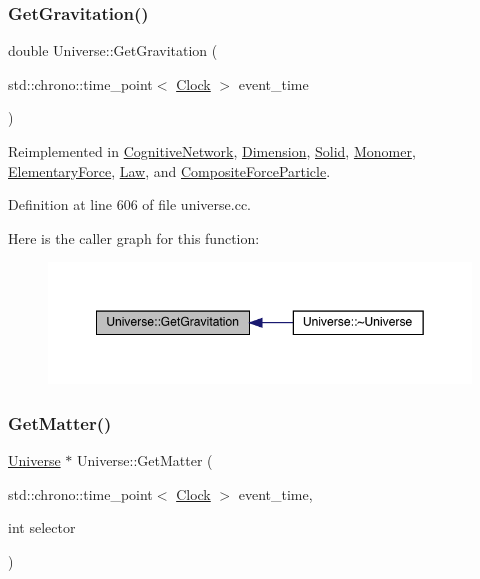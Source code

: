 \subsubsection{\texorpdfstring{Get\+Gravitation()}{GetGravitation()}}
{\footnotesize\ttfamily double Universe\+::\+Get\+Gravitation (\begin{DoxyParamCaption}\item[{std\+::chrono\+::time\+\_\+point$<$ \hyperlink{universe_8h_a0ef8d951d1ca5ab3cfaf7ab4c7a6fd80}{Clock} $>$}]{event\+\_\+time }\end{DoxyParamCaption})\hspace{0.3cm}{\ttfamily [virtual]}}



Reimplemented in \hyperlink{class_cognitive_network_a4b5150310288c52f00ecb745ae9e7f86}{Cognitive\+Network}, \hyperlink{class_dimension_a652220a2eb1b26c749ad032865d81788}{Dimension}, \hyperlink{class_solid_ab5ecb5598be93fe3cd2a21c0cfd363c8}{Solid}, \hyperlink{class_monomer_aa5f7b901e15c9a9eb6e1c3564cd06e4f}{Monomer}, \hyperlink{class_elementary_force_a579afb8079668f0587096934d1de9c04}{Elementary\+Force}, \hyperlink{class_law_a84bdc0c2ca97a9c19422018ff761b992}{Law}, and \hyperlink{class_composite_force_particle_a06483dc73c156679f34acf85aa5f924e}{Composite\+Force\+Particle}.



Definition at line 606 of file universe.\+cc.

Here is the caller graph for this function\+:
\nopagebreak
\begin{figure}[H]
\begin{center}
\leavevmode
\includegraphics[width=349pt]{class_universe_ab0404e774ee0ed66b597ff5b8e989446_icgraph}
\end{center}
\end{figure}
\mbox{\label{class_universe_a69de663cf2e32e65ed28c44ae666db3a}} 
\subsubsection{\texorpdfstring{Get\+Matter()}{GetMatter()}}
{\footnotesize\ttfamily \hyperlink{class_universe}{Universe} $\ast$ Universe\+::\+Get\+Matter (\begin{DoxyParamCaption}\item[{std\+::chrono\+::time\+\_\+point$<$ \hyperlink{universe_8h_a0ef8d951d1ca5ab3cfaf7ab4c7a6fd80}{Clock} $>$}]{event\+\_\+time,  }\item[{int}]{selector }\end{DoxyParamCaption})}



